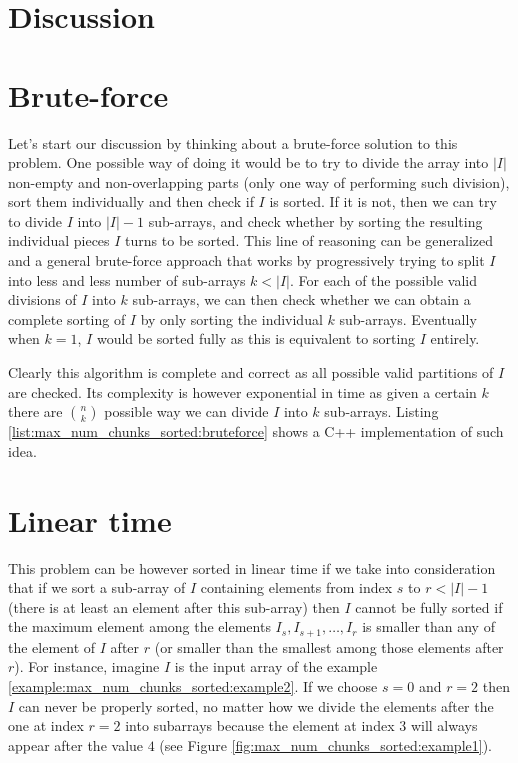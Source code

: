 \section{Discussion}
\label{max_num_chunks_sorted:sec:discussion}

\section{Brute-force}
\label{max_num_chunks_sorted:sec:bruteforce}


Let's start our discussion by thinking about a brute-force solution to this problem. 
One possible way of doing it would be to try to divide the array into $|I|$ non-empty and non-overlapping parts (only one way of performing such division), 
sort  them individually and then check if $I$ is sorted. 
If it is not, then we can try to divide $I$ into $|I|-1$ sub-arrays,
and check whether by sorting the resulting individual pieces $I$ turns to be sorted.
This line of reasoning can be generalized and a general brute-force approach
that works by progressively trying to split $I$ into less and less number of sub-arrays $k <|I|$.
For each of the possible valid divisions of $I$ into $k$ sub-arrays, we can then check whether we can obtain a complete sorting of $I$ by only sorting the individual $k$ sub-arrays.
Eventually when $k=1$, $I$ would be sorted fully as this is equivalent to sorting $I$ entirely.

Clearly this algorithm is complete and correct
as all possible valid partitions of $I$ are checked. Its complexity is however exponential
in time as given a certain $k$ there are ${n \choose k} $ possible way we can divide $I$ into $k$ sub-arrays. 
Listing \ref{list:max_num_chunks_sorted:bruteforce} shows a C++ implementation of such idea. 



    



\section{Linear time}
\label{max_num_chunks_sorted:sec:lineartime}
This problem can be however sorted in linear time if we take into consideration that if we sort a sub-array of $I$
containing elements from index $s$ to $r< |I|-1$  (there is at least an element after this sub-array) 
then $I$ cannot be fully sorted if the maximum element among the elements $I_s, I_{s+1},\ldots, I_r$
is smaller than any of the element of $I$ after $r$ (or smaller than the smallest among those elements after $r$). 
For instance, imagine $I$ is the input array of the example \ref{example:max_num_chunks_sorted:example2}. 
If we choose $s=0$ and $r=2$ then $I$ can never be properly sorted, no matter how we divide the elements after the one at index $r=2$ into subarrays
because the element at index $3$ will always appear after the value $4$ (see Figure \ref{fig:max_num_chunks_sorted:example1}).

